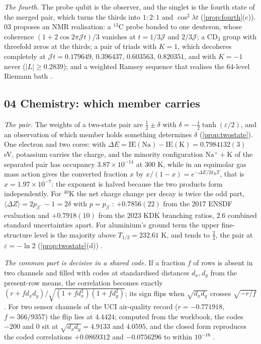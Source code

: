 \documentclass[11pt]{article}
\theoremstyle{definition}\newtheorem{definition}[theorem]{Definition}
\theoremstyle{remark}\newtheorem{remark}[theorem]{Remark}
\begin{document}
\emph{The fourth.} The probe qubit is the observer, and the singlet is the fourth state of the merged pair, which turns the thirds into $1{:}2{:}1$ and $\cos^2\lambda t$ (\cref{prop:fourth}(c)). 03 proposes an NMR realisation: a ${}^{13}$C probe bonded to one deuteron, whose coherence $(1+2\cos2\pi\mathcal Jt)/3$ vanishes at $t=1/3\mathcal J$ and $2/3\mathcal J$; a CD$_3$ group with threefold zeros at the thirds; a pair of triads with $K=1$, which decoheres completely at $\mathcal Jt=0.179649$, $0.396437$, $0.603563$, $0.820351$, and with $K=-1$ never ($|L|\ge0.2839$); and a weighted Ramsey sequence that realises the $64$-level Riemann bath \cite{SQuant}.

\subsection{04 Chemistry: which member carries}\label{sec:f04}
\emph{The pair.} The weights of a two-state pair are $\frac12\pm\delta$ with $\delta=-\frac12\tanh(\varepsilon/2)$, and an observation of which member holds something determines $\delta$ (\cref{prop:twostate}). One electron and two cores: with $\Delta E=\mathrm{IE(Na)}-\mathrm{IE(K)}=0.7984132(3)$ eV, potassium carries the charge, and the minority configuration $\mathrm{Na^+}+\mathrm K$ of the separated pair has occupancy $3.87\times10^{-14}$ at $300$ K, while in an equimolar gas mass action gives the converted fraction $x$ by $x/(1-x)=e^{-\Delta E/2k_BT}$, that is $x=1.97\times10^{-7}$: the exponent is halved because the two products form independently. For ${}^{40}$K the net charge change per decay is twice the odd part, $\langle\Delta Z\rangle=2p_{\beta^-}-1=2\delta$ with $p=p_{\beta^-}$: $+0.7856(22)$ from the 2017 ENSDF evaluation and $+0.7918(10)$ from the 2023 KDK branching ratios, $2.6$ combined standard uncertainties apart. For aluminium's ground term the upper fine-structure level is the majority above $T_{1/2}=232.61$ K, and tends to $\frac23$, the pair at $\varepsilon=-\ln2$ (\cref{prop:twostate}(d)) \cite{SChem}.

\emph{The common part is decisive in a shared code.} If a fraction $f$ of rows is absent in two channels and filled with codes at standardised distances $d_x,d_y$ from the present-row means, the correlation becomes exactly $(r+fd_xd_y)/\sqrt{(1+fd_x^2)(1+fd_y^2)}$; its sign flips when $\sqrt{d_xd_y}$ crosses $\sqrt{-r/f}$. For two sensor channels of the UCI air-quality record \cite{UCIair} ($r=-0.771918$, $f=366/9357$) the flip lies at $4.4424$; computed from the workbook, the codes $-200$ and $0$ sit at $\sqrt{d_xd_y}=4.9133$ and $4.0595$, and the closed form reproduces the coded correlations $+0.0869312$ and $-0.0756296$ to within $10^{-16}$ \cite{SChem}.
\end{document}
